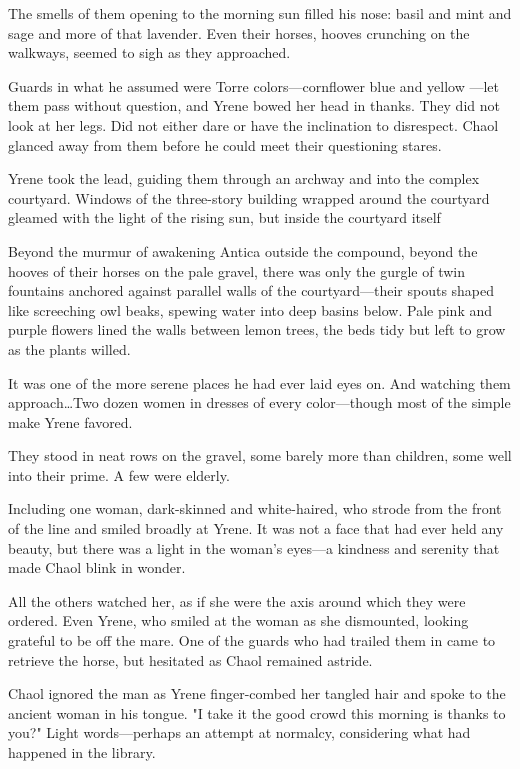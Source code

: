 The smells of them opening to the morning sun filled his nose: basil and mint and sage and more of that lavender.
Even their horses, hooves crunching on the walkways, seemed to sigh as they approached.

Guards in what he assumed were Torre colors---cornflower blue and yellow ---let them pass without question, and Yrene bowed her head in thanks.
They did not look at her legs.
Did not either dare or have the inclination to disrespect.
Chaol glanced away from them before he could meet their questioning stares.

Yrene took the lead, guiding them through an archway and into the complex courtyard.
Windows of the three-story building wrapped around the courtyard gleamed with the light of the rising sun, but inside the courtyard itself 

Beyond the murmur of awakening Antica outside the compound, beyond the hooves of their horses on the pale gravel, there was only the gurgle of twin fountains anchored against parallel walls of the courtyard---their spouts shaped like screeching owl beaks, spewing water into deep basins below.
Pale pink and purple flowers lined the walls between lemon trees, the beds tidy but left to grow as the plants willed.

It was one of the more serene places he had ever laid eyes on.
And watching them approach\ldots Two dozen women in dresses of every color---though most of the simple make Yrene favored.

They stood in neat rows on the gravel, some barely more than children, some well into their prime.
A few were elderly.

Including one woman, dark-skinned and white-haired, who strode from the front of the line and smiled broadly at Yrene.
It was not a face that had ever held any beauty, but there was a light in the woman's eyes---a kindness and serenity that made Chaol blink in wonder.

All the others watched her, as if she were the axis around which they were ordered.
Even Yrene, who smiled at the woman as she dismounted, looking grateful to be off the mare.
One of the guards who had trailed them in came to retrieve the horse, but hesitated as Chaol remained astride.

Chaol ignored the man as Yrene finger-combed her tangled hair and spoke to the ancient woman in his tongue.
"I take it the good crowd this morning is thanks to you?"
Light words---perhaps an attempt at normalcy, considering what had happened in the library.

